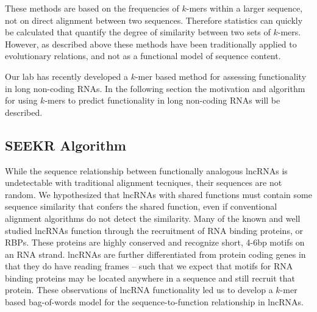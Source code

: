 These methods are based on the frequencies of $k$-mers within a larger sequence, not on direct alignment between two sequences. Therefore statistics can quickly be calculated that quantify the degree of similarity between two sets of $k$-mers. However, as described above these methods have been traditionally applied to evolutionary relations, and not as a functional model of sequence content. 

Our lab has recently developed a $k$-mer based method for assessing functionality in long non-coding RNAs. In the following section the motivation and algorithm for using $k$-mers to predict functionality in long non-coding RNAs will be described. 

\subsection{SEEKR Algorithm}

 While the sequence relationship between functionally analogous lncRNAs is undetectable with traditional alignment tecniques, their sequences are not random. We hypothesized that lncRNAs with shared functions must contain some sequence similarity that confers the shared function, even if conventional alignment algorithms do not detect the similarity. Many of the known and well studied lncRNAs function through the recruitment of RNA binding proteins, or RBPs. These proteins are highly conserved and recognize short, 4-6bp motifs on an RNA strand. lncRNAs are further differentiated from protein coding genes in that they do have reading frames -- such that we expect that motifs for RNA binding proteins may be located anywhere in a sequence and still recruit that protein. These observations of lncRNA functionality led us to develop a $k$-mer based bag-of-words model for the sequence-to-function relationship in lncRNAs.
 
